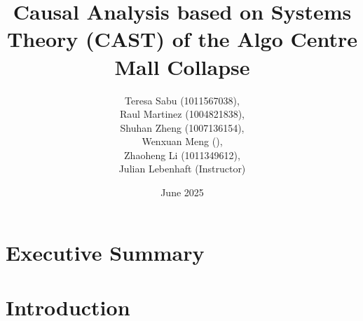\documentclass[12pt]{article}
\title{}
\date{June 2025}
\begin{document}
\title{Causal Analysis based on Systems Theory (CAST) of the Algo Centre Mall Collapse}
\author{Teresa Sabu (1011567038), \\
Raul Martinez (1004821838), \\
Shuhan Zheng (1007136154), \\
Wenxuan Meng (), \\
Zhaoheng Li (1011349612), \\
Julian Lebenhaft (Instructor)
}
\maketitle

\newpage



\tableofcontents
\newpage

\section*{Executive Summary}


\section{Introduction} 
\end{document}
